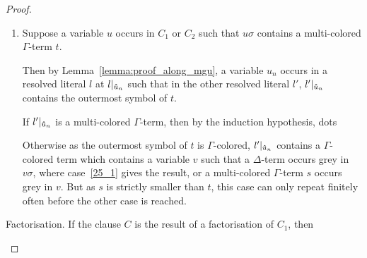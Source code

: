\documentclass[,%
	draft=false,%
	numbers=noendperiod
	11pt,
	a4paper,
	oneside,%
	openany,
]{memoir}
\begin{document}
\begin{proof}
\begin{description}
\begin{enumerate}
\begin{comment}
						As $\sigma$ is the result of the $\mgu$ algorithm as defined in \ref{def:mgu_algo},
						there must be an occurrence of $u$ in the resolved literal, say w.l.o.g.\ at $l\at{\bhat u}$,
						such that $l'\at{\bhat u}$ is an abstraction of $u\sigma$ which is different from $u$ and as $l\sigma = l'\sigma$, $l'\at{\bhat u}$ is contained in a $\Gamma$-colored term.
						\begin{itemize}
							\item Suppose that $l'\at{\bhat u}$ contains the outermost symbol of $s$.
								Then it is a $\Delta$-term contained in a $\Gamma$-term, so by the induction hypothesis,
								$x_? \apath_{G_{C_1}} r$, where $r$ is the maximal colored term containing $l'\at{\bhat u}$.
								\mytodo{}

							\item Otherwise $l'\at{\bhat u}$ contains a variable $v$ such that $v\sigma$ contains $s$.

								same circumstances as $u$, only finitely often


						\end{itemize}

					\end{comment}

				\item Suppose a variable $u$ occurs in $C_1$ or $C_2$ such that $u\sigma$ contains a multi-colored $\Gamma$-term $t$.

					Then by Lemma~\ref{lemma:proof_along_mgu},
					a variable $u_n$ occurs in a resolved literal $l$ at $l|_{\bm\hat u_n}$ such that in the other resolved literal $l'$, $l'|_{\bm\hat u_n}$ contains the outermost symbol of $t$.

					If $l'|_{\bm\hat u_n}$ is a multi-colored $\Gamma$-term, then by the induction hypothesis, dots

					Otherwise as the outermost symbol of $t$ is $\Gamma$-colored, $l'|_{\bm\hat u_n}$ contains a $\Gamma$-colored term which contains a variable $v$ such that a $\Delta$-term occurs grey in $v\sigma$, where case~\ref{25_1} gives the result, or a multi-colored $\Gamma$-term $s$ occurs grey in $v$. But as $s$ is strictly smaller than $t$, this case can only repeat finitely often before the other case is reached.

			\end{enumerate}


		\item{}Factorisation.
			If the clause $C$ is the result of a factorisation of $C_1$, then
			\mytodo{}
			\qedhere
	\end{description}


\end{proof}
\end{document}
